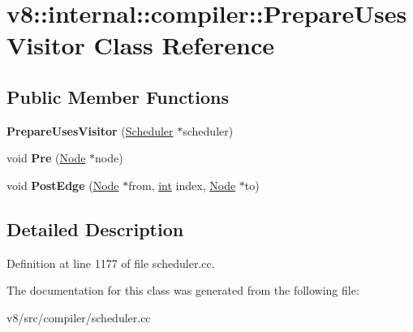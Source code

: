 \hypertarget{classv8_1_1internal_1_1compiler_1_1PrepareUsesVisitor}{}\section{v8\+:\+:internal\+:\+:compiler\+:\+:Prepare\+Uses\+Visitor Class Reference}
\label{classv8_1_1internal_1_1compiler_1_1PrepareUsesVisitor}
\subsection*{Public Member Functions}
\begin{DoxyCompactItemize}
\item 
\mbox{\label{classv8_1_1internal_1_1compiler_1_1PrepareUsesVisitor_a92415be051233353ff6920119c31fb94}} 
{\bfseries Prepare\+Uses\+Visitor} (\mbox{\hyperlink{classv8_1_1internal_1_1compiler_1_1Scheduler}{Scheduler}} $\ast$scheduler)
\item 
\mbox{\label{classv8_1_1internal_1_1compiler_1_1PrepareUsesVisitor_a9a10984ad35e1433a1e633b48301d717}} 
void {\bfseries Pre} (\mbox{\hyperlink{classv8_1_1internal_1_1compiler_1_1Node}{Node}} $\ast$node)
\item 
\mbox{\label{classv8_1_1internal_1_1compiler_1_1PrepareUsesVisitor_af0b4a0f7171f69b1a38c2189252d6b59}} 
void {\bfseries Post\+Edge} (\mbox{\hyperlink{classv8_1_1internal_1_1compiler_1_1Node}{Node}} $\ast$from, \mbox{\hyperlink{classint}{int}} index, \mbox{\hyperlink{classv8_1_1internal_1_1compiler_1_1Node}{Node}} $\ast$to)
\end{DoxyCompactItemize}


\subsection{Detailed Description}


Definition at line 1177 of file scheduler.\+cc.



The documentation for this class was generated from the following file\+:\begin{DoxyCompactItemize}
\item 
v8/src/compiler/scheduler.\+cc\end{DoxyCompactItemize}
